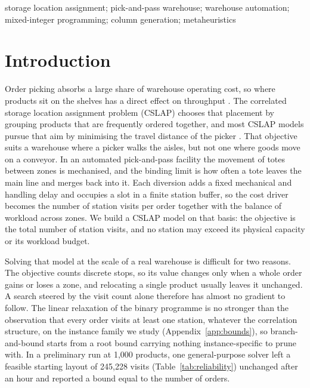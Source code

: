 \documentclass[]{interact}
\begin{document}
\begin{keywords}
storage location assignment; pick-and-pass warehouse; warehouse automation; mixed-integer programming; column generation; metaheuristics
\end{keywords}


\section{Introduction}
Order picking absorbs a large share of warehouse operating cost, so where products sit on the shelves has a direct effect on throughput \citep{xie2024combi}. The correlated storage location assignment problem (CSLAP) chooses that placement by grouping products that are frequently ordered together, and most CSLAP models pursue that aim by minimising the travel distance of the picker \citep{islam2023}. That objective suits a warehouse where a picker walks the aisles, but not one where goods move on a conveyor. In an automated pick-and-pass facility the movement of totes between zones is mechanised, and the binding limit is how often a tote leaves the main line and merges back into it. Each diversion adds a fixed mechanical and handling delay and occupies a slot in a finite station buffer, so the cost driver becomes the number of station visits per order together with the balance of workload across zones. We build a CSLAP model on that basis: the objective is the total number of station visits, and no station may exceed its physical capacity or its workload budget.

Solving that model at the scale of a real warehouse is difficult for two reasons. The objective counts discrete stops, so its value changes only when a whole order gains or loses a zone, and relocating a single product usually leaves it unchanged. A search steered by the visit count alone therefore has almost no gradient to follow. The linear relaxation of the binary programme is no stronger than the observation that every order visits at least one station, whatever the correlation structure, on the instance family we study (Appendix~\ref{app:bounds}), so branch-and-bound starts from a root bound carrying nothing instance-specific to prune with. In a preliminary run at 1,000 products, one general-purpose solver left a feasible starting layout of 245,228 visits (Table~\ref{tab:reliability}) unchanged after an hour and reported a bound equal to the number of orders.
\end{document}
